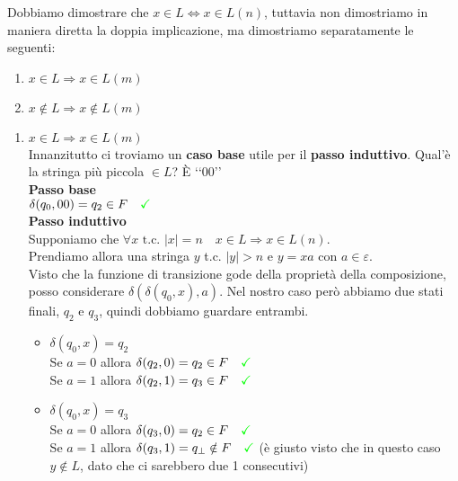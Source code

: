 \documentclass[a4paper,oneside]{scrbook}
\newcommand{\greenmark}{\quad \textcolor{green}{\checkmark}}
\begin{document}
Dobbiamo dimostrare che $x\in L \Leftrightarrow x\in L(n)$, tuttavia non dimostriamo in maniera diretta la doppia implicazione, ma dimostriamo separatamente le seguenti:
\begin{enumerate}
	\item $x\in L \Rightarrow x \in L(m)$
	\item $x\notin L \Rightarrow x \notin L(m)$
\end{enumerate}
\begin{enumerate}
	\item $x\in L \Rightarrow x \in L(m)$\\
	Innanzitutto ci troviamo un \textbf{caso base} utile per il \textbf{passo induttivo}. Qual'è la stringa più piccola $\in L$? È ‘‘$00$’’\\
	\textbf{Passo base}\\
	$ \delta(q_0,00)=q_2 \in F \greenmark $\\
	\textbf{Passo induttivo}\\
	Supponiamo che $\forall x \text{ t.c. } |x|=n \quad x \in L \Rightarrow x\in L(n)$.\\
	Prendiamo allora una stringa $y$ t.c. $|y|>n$ e $y=xa \text{ con }a\in\varepsilon$.\\
	Visto che la funzione di transizione gode della proprietà della composizione, posso considerare $\delta(\delta(q_0,x),a)$.
	Nel nostro caso però abbiamo due stati finali, $q_2$ e $q_3$, quindi dobbiamo guardare entrambi.
	\begin{itemize}
		\item $\delta(q_0,x)=q_2$\\
		Se $a=0$ allora $\delta(q_2,0)=q_2 \in F \greenmark$\\
		Se $a=1$ allora $\delta(q_2,1)=q_3 \in F \greenmark$
		\item $\delta(q_0,x)=q_3$\\
		Se $a=0$ allora $\delta(q_3,0)=q_2 \in F \greenmark$\\
		Se $a=1$ allora $\delta(q_3,1)=q_\bot \notin F \greenmark$ (è giusto visto che in questo caso $y\notin L$, dato che ci sarebbero due 1 consecutivi)
	\end{itemize}
	

\end{enumerate}
\end{document}

